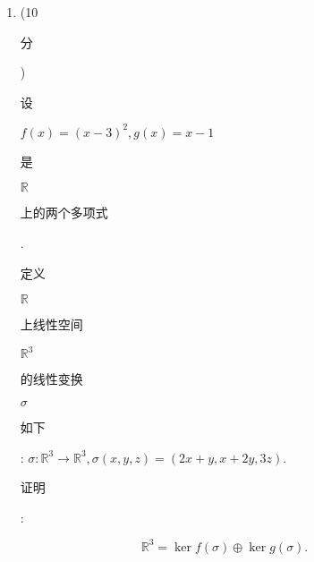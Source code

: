 \documentclass[10pt]{article}
\begin{document}
\begin{enumerate}
  \item (10 \begin{CJK}{UTF8}{mj}分\end{CJK}) \begin{CJK}{UTF8}{mj}设\end{CJK} $f(x)=(x-3)^{2}, g(x)=x-1$ \begin{CJK}{UTF8}{mj}是\end{CJK} $\mathbb{R}$ \begin{CJK}{UTF8}{mj}上的两个多项式\end{CJK}. \begin{CJK}{UTF8}{mj}定义\end{CJK} $\mathbb{R}$ \begin{CJK}{UTF8}{mj}上线性空间\end{CJK} $\mathbb{R}^{3}$ \begin{CJK}{UTF8}{mj}的线性变换\end{CJK} $\sigma$ \begin{CJK}{UTF8}{mj}如下\end{CJK}: $\sigma: \mathbb{R}^{3} \rightarrow \mathbb{R}^{3}, \sigma(x, y, z)=(2 x+y, x+2 y, 3 z)$. \begin{CJK}{UTF8}{mj}证明\end{CJK}:
\end{enumerate}
$$
\mathbb{R}^{3}=\operatorname{ker} f(\sigma) \oplus \operatorname{ker} g(\sigma) .
$$
\end{document}
